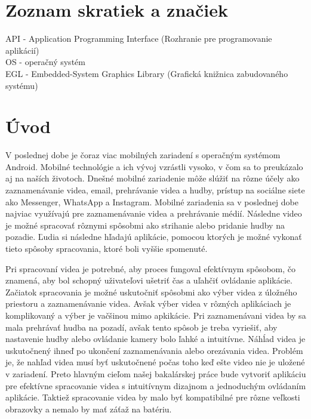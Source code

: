\documentclass[12pt, oneside]{book}
\begin{document}
\tableofcontents
\thispagestyle{empty}

\newpage

\thispagestyle{empty}
\listoftables
\listoffigures
\thispagestyle{empty}

\newpage

\chapter*{Zoznam skratiek a značiek}
\thispagestyle{empty}

API - Application Programming Interface (Rozhranie pre programovanie aplikácií)
\\
OS - operačný systém
\\
EGL - Embedded-System Graphics Library (Grafická knižnica zabudovaného systému)
\\



\newpage


\chapter*{Úvod}

\hspace{15pt} V poslednej dobe je čoraz viac mobilných zariadení s operačným systémom Android. Mobilné technológie a ich vývoj vzrástli vysoko, v čom sa to preukázalo aj na naších životoch. Dnešné mobilné zariadenie môže slúžiť na rôzne účely ako zaznamenávanie videa, email, prehrávanie videa a hudby, prístup na sociálne siete ako Messenger, WhatsApp a Instagram. Mobilné zariadenia sa v poslednej dobe najviac využívajú pre zaznamenávanie videa a prehrávanie médií. Následne video je možné spracovať rôznymi spôsobmi ako strihanie alebo pridanie hudby na pozadie. Ľudia si následne hľadajú aplikácie, pomocou ktorých je možné vykonať tieto spôsoby spracovania, ktoré boli vyššie spomenuté. 

Pri spracovaní videa je potrebné, aby proces fungoval efektívnym spôsobom, čo znamená, aby bol schopný uživateľovi ušetriť čas a uľahčiť ovládanie aplikácie. Začiatok spracovania je možné uskutočniť spôsobmi ako výber videa z úložného priestoru a zaznamenávanie videa. Avšak výber videa v rôzných aplikáciach je komplikovaný a výber je vačšinou mimo apkikácie. Pri zaznamenávani videa by sa mala prehrávať hudba na pozadí, avšak tento spôsob je treba vyriešiť, aby nastavenie hudby alebo ovládanie kamery bolo ľahké a intuitívne. Náhĺad videa je uskutočnený ihneď po ukončení zaznamenávania alebo orezávania videa. Problém je, že nahľad videa musí byť uskutočnené počas toho keď ešte video nie je uložené v zariadení. Preto hlavným cieľom našej bakalárskej práce bude vytvoriť aplikáciu pre efektívne spracovanie videa s intuitívnym dizajnom a jednoduchým ovládaním aplikácie. Taktiež spracovanie videa by malo byť kompatibilné pre rôzne veľkosti obrazovky a nemalo by mať záťaž na batériu.
\end{document}
